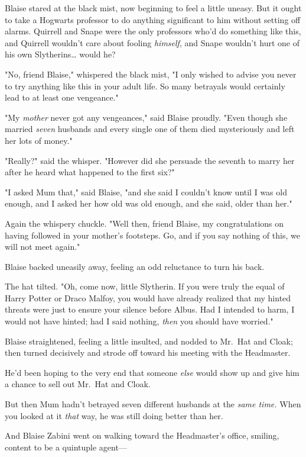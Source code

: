 Blaise stared at the black mist, now beginning to feel a little uneasy. But it 
ought to take a Hogwarts professor to do anything significant to him without 
setting off alarms. Quirrell and Snape were the only professors who'd do 
something like this, and Quirrell wouldn't care about fooling \emph{himself}, 
and Snape wouldn't hurt one of his own Slytherins{\ldots} would he?

"No, friend Blaise," whispered the black mist, "I only wished to advise you 
never to try anything like this in your adult life. So many betrayals would 
certainly lead to at least one vengeance."

"My \emph{mother} never got any vengeances," said Blaise proudly. "Even though 
she married \emph{seven} husbands and every single one of them died 
mysteriously and left her lots of money."

"Really?" said the whisper. "However did she persuade the seventh to marry her 
after he heard what happened to the first six?"

"I asked Mum that," said Blaise, "and she said I couldn't know until I was old 
enough, and I asked her how old was old enough, and she said, older than her."

Again the whispery chuckle. "Well then, friend Blaise, my congratulations on 
having followed in your mother's footsteps. Go, and if you say nothing of this, 
we will not meet again."

Blaise backed uneasily away, feeling an odd reluctance to turn his back.

The hat tilted. "Oh, come now, little Slytherin. If you were truly the equal of 
Harry Potter or Draco Malfoy, you would have already realized that my hinted 
threats were just to ensure your silence before Albus. Had I intended to harm, 
I would not have hinted; had I said nothing, \emph{then} you should have 
worried."

Blaise straightened, feeling a little insulted, and nodded to Mr.~Hat and 
Cloak; then turned decisively and strode off toward his meeting with the 
Headmaster.

He'd been hoping to the very end that someone \emph{else} would show up and 
give him a chance to sell out Mr.~Hat and Cloak.

But then Mum hadn't betrayed seven different husbands at the \emph{same time.} 
When you looked at it \emph{that} way, he was still doing better than her.

And Blaise Zabini went on walking toward the Headmaster's office, smiling, 
content to be a quintuple agent---

